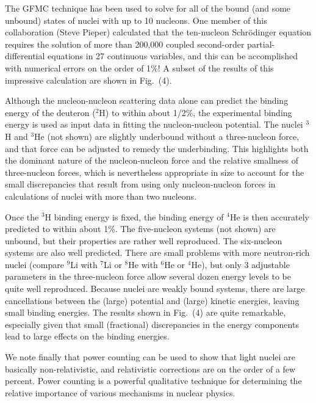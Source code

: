 \documentclass{svmult}
\begin{document}
The GFMC technique has been used to solve 
for all of the bound (and some unbound) states of nuclei with up to 10 nucleons.
One member of this collaboration (Steve Pieper\cite{steve}) calculated that the
ten-nucleon Schr\"odinger equation requires the solution of more than 200,000
coupled second-order partial-differential equations in 27 continuous variables,
and this can be accomplished with numerical errors on the order of 1\%! A subset
of the results of this impressive calculation are shown in Fig.~(4)\cite{10A}.

Although the nucleon-nucleon scattering data alone can predict the binding
energy of the deuteron ($^2$H) to within about 1/2\%, the experimental binding
energy is used as input data in fitting the nucleon-nucleon potential. The
nuclei $^3$H and $^3$He (not shown) are slightly underbound without a
three-nucleon force, and that force can be
adjusted to remedy the underbinding. This highlights both the dominant nature of
the nucleon-nucleon force and the relative smallness of three-nucleon forces,
which is nevertheless appropriate in size to account for the small discrepancies
that result from using only nucleon-nucleon forces in calculations of nuclei
with more than two nucleons.

Once the $^3$H binding energy is fixed, the binding energy of $^4$He is then
accurately predicted to within about 1\%. The five-nucleon systems (not shown)
are unbound, but their properties are rather well reproduced. The six-nucleon
systems are also well predicted.  There are small problems with more
neutron-rich nuclei (compare $^9$Li with $^7$Li or $^8$He with $^6$He or
$^4$He), but only 3 adjustable parameters in the three-nucleon force allow
several dozen energy levels to be quite well 
reproduced\cite{10A}. Because
nuclei are weakly bound systems, there are large cancellations between the
(large) potential and (large) kinetic energies, leaving small binding energies.
The results shown in Fig.~(4) are quite remarkable, especially given that small
(fractional) discrepancies in the energy components lead to large effects on the
binding energies.

We note finally that power counting can be used to show
that light nuclei are basically non-relativistic, and relativistic corrections
are on the order of a few percent.  Power counting is a powerful qualitative
technique for determining the relative importance of various mechanisms in
nuclear physics.
\end{document}
